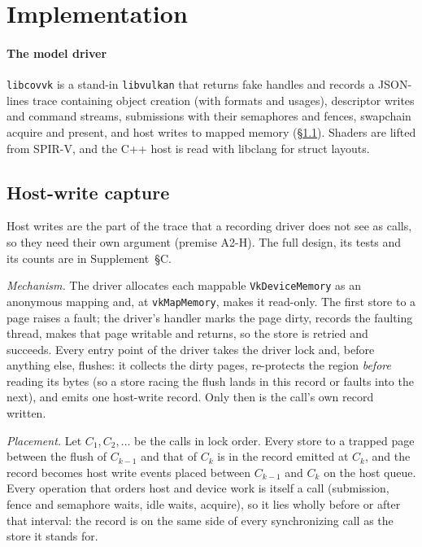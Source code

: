 \documentclass[acmtog,anonymous,review]{acmart}
\newcommand{\code}[1]{\texttt{#1}}
\newcommand{\supp}[1]{Supplement~\S#1}
\begin{document}


\section{Implementation}
\label{sec:impl}

\paragraph{The model driver}
\code{libcovvk} is a stand-in \code{libvulkan} that returns fake handles and records a JSON-lines trace containing
object creation (with formats and usages), descriptor writes and command streams, submissions with their semaphores
and fences, swapchain acquire and present, and host writes to mapped memory (\S\ref{sec:capture}). Shaders are lifted
from SPIR-V, and the C++ host is read with libclang for struct layouts.

\subsection{Host-write capture}
\label{sec:capture}
Host writes are the part of the trace that a recording driver does not see as calls, so they need their own
argument (premise A2-H). The full design, its tests and its counts are in \supp{C}.

\emph{Mechanism.} The driver allocates each mappable \code{VkDeviceMemory} as an anonymous mapping and, at
\code{vkMapMemory}, makes it read-only. The first store to a page raises a fault; the driver's handler marks the
page dirty, records the faulting thread, makes that page writable and returns, so the store is retried and succeeds.
Every entry point of the driver takes the driver lock and, before anything else, flushes: it collects the dirty pages,
re-protects the region \emph{before} reading its bytes (so a store racing the flush lands in this record or faults
into the next), and emits one host-write record. Only then is the call's own record written.

\emph{Placement.} Let $C_1, C_2, \dots$ be the calls in lock order. Every store to a trapped page between the flush of
$C_{k-1}$ and that of $C_k$ is in the record emitted at $C_k$, and the record becomes host write events placed
between $C_{k-1}$ and $C_k$ on the host queue. Every operation that orders host and device work is itself a call
(submission, fence and semaphore waits, idle waits, acquire), so it lies wholly before or after that interval: the
record is on the same side of every synchronizing call as the store it stands for.
\end{document}
